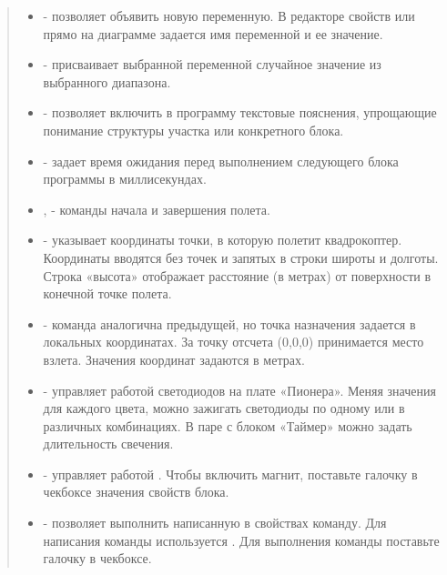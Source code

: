 \documentclass[a4paper,10pt,russian]{sphinxmanual}
\begin{document}
\begin{quote}
\begin{itemize}
\item {} 
 - позволяет объявить новую переменную. В редакторе свойств или прямо на диаграмме задается имя переменной и ее значение.

\item {} 
 - присваивает выбранной переменной случайное значение из выбранного диапазона.

\item {} 
 - позволяет включить в программу текстовые пояснения, упрощающие понимание структуры участка или конкретного блока.

\item {} 
 - задает время ожидания перед выполнением следующего блока программы в миллисекундах.

\item {} 
,   - команды начала и завершения полета.

\item {} 
 - указывает координаты точки, в которую полетит квадрокоптер. Координаты вводятся без точек и запятых в строки широты и долготы. Строка «высота» отображает расстояние (в метрах) от поверхности в конечной точке полета.

\item {} 
 - команда аналогична предыдущей, но точка назначения задается в локальных координатах. За точку отсчета (0,0,0) принимается место взлета. Значения координат задаются в метрах.

\item {} 
 - управляет работой светодиодов на плате «Пионера». Меняя значения для каждого цвета, можно зажигать светодиоды по одному или в различных комбинациях. В паре с блоком «Таймер» можно задать длительность свечения.

\item {} 
 - управляет работой . Чтобы включить магнит, поставьте галочку в чекбоксе значения свойств блока.

\item {} 
 - позволяет выполнить написанную в свойствах команду. Для написания команды используется . Для выполнения команды поставьте галочку в чекбоксе.


\end{itemize}
\end{quote}
\end{document}
